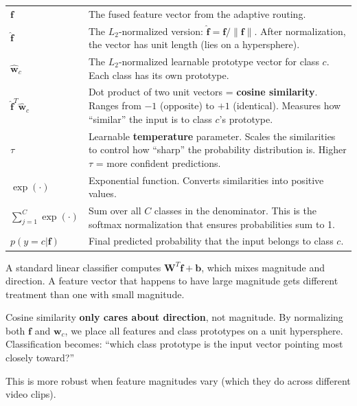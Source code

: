 \documentclass[12pt, a4paper]{article}
\begin{document}
\begin{explainbox}
\begin{tabular}{lp{11cm}}
$\mathbf{f}$ & The fused feature vector from the adaptive routing.\\[0.2cm]
$\hat{\mathbf{f}}$ & The $L_2$-normalized version: $\hat{\mathbf{f}} = \mathbf{f}/\|\mathbf{f}\|$. After normalization, the vector has unit length (lies on a hypersphere).\\[0.2cm]
$\hat{\mathbf{w}}_c$ & The $L_2$-normalized learnable prototype vector for class $c$. Each class has its own prototype.\\[0.2cm]
$\hat{\mathbf{f}}^T \hat{\mathbf{w}}_c$ & Dot product of two unit vectors = \textbf{cosine similarity}. Ranges from $-1$ (opposite) to $+1$ (identical). Measures how ``similar'' the input is to class $c$'s prototype.\\[0.2cm]
$\tau$ & Learnable \textbf{temperature} parameter. Scales the similarities to control how ``sharp'' the probability distribution is. Higher $\tau$ = more confident predictions.\\[0.2cm]
$\exp(\cdot)$ & Exponential function. Converts similarities into positive values.\\[0.2cm]
$\sum_{j=1}^{C} \exp(\cdot)$ & Sum over all $C$ classes in the denominator. This is the softmax normalization that ensures probabilities sum to 1.\\[0.2cm]
$p(y=c|\mathbf{f})$ & Final predicted probability that the input belongs to class $c$.
\end{tabular}
\end{explainbox}

\begin{analogybox}
A standard linear classifier computes $\mathbf{W}^T \mathbf{f} + \mathbf{b}$, which mixes magnitude and direction. A feature vector that happens to have large magnitude gets different treatment than one with small magnitude.

Cosine similarity \textbf{only cares about direction}, not magnitude. By normalizing both $\mathbf{f}$ and $\mathbf{w}_c$, we place all features and class prototypes on a unit hypersphere. Classification becomes: ``which class prototype is the input vector pointing most closely toward?''

This is more robust when feature magnitudes vary (which they do across different video clips).
\end{analogybox}
\end{document}
